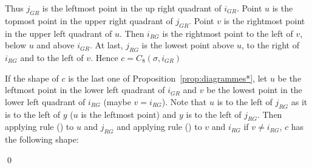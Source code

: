 \documentclass[11pt]{article}
\newenvironment{pf}{{\em \noindent Proof:}}{ \hfill \qed\smallskip}
\newcommand{\rmnum}[1]{\romannumeral #1}
\newcommand{\Vpoint}[2]{\draw (#1,#2) [darkgreen,fill=darkgreen] circle (3pt);}
\newcommand{\Hpoint}[2]{\draw (#1,#2) [darkred,fill=darkred] circle (3pt);}
\newcommand{\zoneRG}[3]{
\draw [very thick,H,Hpoint] (#1,#2) -- +(-#3,0);
\draw [very thick,V,Vpoint] (#1,#2) -- +(0,#3);
\draw [Hfill] (#1,#2) -- +(-#3,#3) -- +(-#3,0);
\draw [Vfill] (#1,#2) -- +(-#3,#3) -- + (0,#3);
}
\newcommand{\zoneGR}[3]{
\draw [very thick,H,Hpoint] (#1,#2) -- +(-#3,0);
\draw [very thick,V,Vpoint] (#1,#2) -- +(0,#3);
\draw [Vfill] (#1,#2) -- +(-#3,#3) -- +(-#3,0);
\draw [Hfill] (#1,#2) -- +(-#3,#3) -- + (0,#3);
}
\begin{document}
\begin{pf}
\begin{minipage}{.2\textwidth}
\end{minipage}
\begin{minipage}{.75\textwidth}
Thus $j_{GR}$ is the leftmost point in the up right quadrant of $i_{GR}$. 
Point $u$ is the topmost point in the upper right quadrant of $j_{GR}$. 
Point $v$ is the rightmost point in the upper left quadrant of $u$. 
Then $i_{RG}$ is the rightmost point to the left of $v$, below $u$ and above $i_{GR}$. 
At last, $j_{RG}$ is the lowest point above $u$, to the right of $i_{RG}$ and to the left of $v$.
Hence $c = C_8(\sigma, i_{GR})$
\end{minipage}

If the shape of $c$ is the last one of Proposition~\ref{prop:diagrammes*},
let $u$ be the leftmost point in the lower left quadrant of $i_{GR}$
and $v$ be the lowest point in the lower left quadrant of $i_{RG}$ (maybe $v = i_{RG}$).
Note that $u$ is to the left of $j_{RG}$ as it is to the left of $y$ ($u$ is the leftmost point) and $y$ is to the left of $j_{RG}$. 
Then applying rule (\rmnum{1}) to $u$ and $j_{RG}$
and applying rule (\rmnum{2}) to $v$ and $i_{RG}$ if $v \neq i_{RG}$, $c$ has the following shape:


\end{pf}
\end{document}
